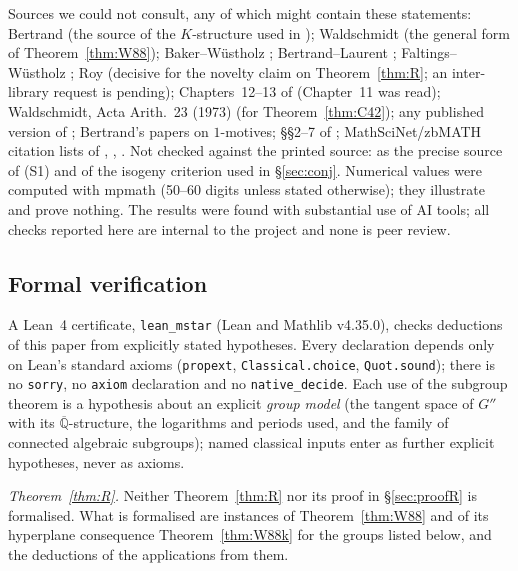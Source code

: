 \documentclass[11pt]{amsart}
\theoremstyle{definition}
\newcommand{\Qb}{\overline{\mathbb{Q}}}
\begin{document}
Sources we could not consult, any of which might contain these statements: Bertrand \cite{Be83} (the source of the
$K$-structure used in \cite{RW93}); Waldschmidt \cite{W90} (the general form of Theorem~\ref{thm:W88}); Baker--W\"ustholz
\cite[\S6.2]{BW07}; Bertrand--Laurent \cite{BL81}; Faltings--W\"ustholz \cite{FW84}; Roy \cite{R1} (decisive for the novelty claim on Theorem~\ref{thm:R}; an
inter-library request is pending); Chapters~12--13 of \cite{W00} (Chapter~11 was read); Waldschmidt, Acta Arith.\ 23
(1973) (for Theorem~\ref{thm:C42}); any published version of
\cite{To23}; Bertrand's papers on $1$-motives; \S\S2--7 of \cite{GU}; MathSciNet/zbMATH citation lists of \cite{RW93},
\cite{W88}, \cite{WW85}. Not checked against the printed source: \cite{Sh98} as the precise source of (S1) and of the
isogeny criterion used in \S\ref{sec:conj}. Numerical values were computed with mpmath (50--60 digits unless stated otherwise); they
illustrate and prove nothing. The results were found with substantial use of AI tools; all checks reported here are
internal to the project and none is peer review.

\subsection{Formal verification}\label{sec:formal}
A Lean~4 certificate, \texttt{lean\_mstar} (Lean and Mathlib v4.35.0), checks deductions of this paper from explicitly
stated hypotheses. Every declaration depends only on Lean's standard axioms (\texttt{propext}, \texttt{Classical.choice},
\texttt{Quot.sound}); there is no \texttt{sorry}, no \texttt{axiom} declaration and no \texttt{native\_decide}. Each use of
the subgroup theorem is a hypothesis about an explicit \emph{group model} (the tangent space of $G''$ with its
$\Qb$-structure, the logarithms and periods used, and the family of connected algebraic subgroups); named classical inputs
enter as further explicit hypotheses, never as axioms.

\emph{Theorem~\ref{thm:R}.} Neither Theorem~\ref{thm:R} nor its proof in \S\ref{sec:proofR} is formalised. What is
formalised are instances of Theorem~\ref{thm:W88} and of its hyperplane consequence Theorem~\ref{thm:W88k} for the groups
listed below, and the deductions of the applications from them.
\end{document}
